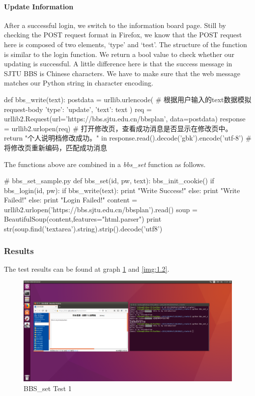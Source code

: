 \documentclass{article}
\begin{document}
\paragraph{Update Information}
After a successful login, we switch to the information board page. Still by checking the POST request format in Firefox, we know that the POST request here is composed of two elements, `type' and `test'. The structure of the function is similar to the login function. We return a bool value to check whether our updating is successful. A little difference here is that the success message in SJTU BBS is Chinese characters. We have to make sure that the web message matches our Python string in character encoding.

\begin{python}
def bbs_write(text):
    postdata = urllib.urlencode({    # 根据用户输入的text数据模拟request-body
        'type': 'update',
        'text': text
    })
    req = urllib2.Request(url='https://bbs.sjtu.edu.cn/bbsplan', data=postdata)
    response = urllib2.urlopen(req)  # 打开修改页，查看成功消息是否显示在修改页中。
    return "个人说明档修改成功。" in response.read().decode('gbk').encode('utf-8')
                                     # 将修改页重新编码，匹配成功消息
\end{python}

The functions above are combined in a \textit{bbs\_set} function as follows.
\begin{python}
# bbs_set_sample.py
def bbs_set(id, pw, text):
    bbs_init_cookie()
    if bbs_login(id, pw):
        if bbs_write(text):
            print "Write Success!"
        else:
            print "Write Failed!"
    else:
        print "Login Failed!"
    content = urllib2.urlopen('https://bbs.sjtu.edu.cn/bbsplan').read()
    soup = BeautifulSoup(content,features="html.parser")
    print str(soup.find('textarea').string).strip().decode('utf8')
\end{python}

\subsubsection{Results}
The test results can be found at graph \ref{img:1.1} and \ref{img:1.2}.

\begin{figure}[htbp]
\centering
\includegraphics[width=13.5cm]{img/test1_1.png}
\caption{BBS\_set Test 1}
\label{img:1.1}
\end{figure}
\end{document}
